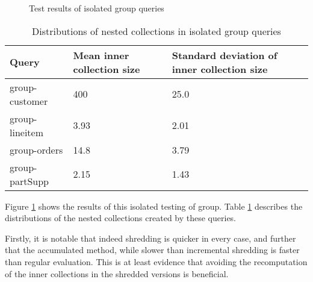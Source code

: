 \begin{figure}
\caption{Test results of isolated group queries}
\label{groupresults}
\end{figure}

\begin{table}[]
\begin{tabular}{|l|l|l|}
\hline
Query          & Mean inner collection size & Standard deviation of inner collection size \\ \hline
group-customer & 400                        & 25.0                                        \\ \hline
group-lineitem & 3.93                       & 2.01                                        \\ \hline
group-orders   & 14.8                       & 3.79                                        \\ \hline
group-partSupp & 2.15                       & 1.43                                        \\ \hline
\end{tabular}
\caption{Distributions of nested collections in isolated group queries}
\label{groupstats}
\end{table}

Figure \ref{groupresults} shows the results of this isolated testing of group. Table \ref{groupstats} describes the distributions of the nested collections created by these queries.

Firstly, it is notable that indeed shredding is quicker in every case, and further that the accumulated method, while slower than incremental shredding is faster than regular evaluation. This is at least evidence that avoiding the recomputation of the inner collections in the shredded versions is beneficial.

